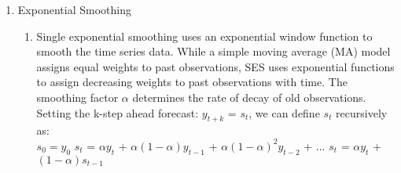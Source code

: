 \documentclass{article}
\begin{document}
\begin{enumerate}[label=1.\arabic*]
\begin{enumerate}[label=(\alph*)]
\end{enumerate}
\item Exponential Smoothing
\begin{enumerate}[label=(\alph*)]
\item Single exponential smoothing uses an exponential window function to smooth the time series data. While a simple moving average (MA) model assigns equal weights to past observations, SES uses exponential functions to assign decreasing weights to past observations with time. The smoothing factor $\alpha$ determines the rate of decay of old observations.  Setting the k-step ahead forecast:
\textit{$y_{t+k}$} = \textit{$s_t$}, we can define \textit{$s_t$} recursively as: \\
$s_0=y_0$
\newline 
\textit{$s_t$} = $\alpha$\textit{$y_t$} + $\alpha(1-\alpha)$\textit{$y_{t-1}$} + $\alpha(1-\alpha)^2$\textit{$y_{t-2}$} + ...
\newline
\textit{$s_t$} = $\alpha$\textit{$y_t$} + $(1-\alpha)$\textit{$s_{t-1}$}
\newline


\end{enumerate}
\end{enumerate}
\end{document}
